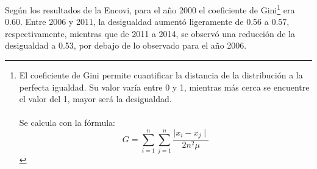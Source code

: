 Según los resultados de la Encovi, para el año 2000 el coeficiente de Gini\footnote{El coeficiente de Gini permite cuantificar la distancia de la distribución a la perfecta igualdad. Su valor varía entre 0 y 1, mientras más cerca se encuentre el valor del 1, mayor será la desigualdad. \\\\ 
	Se calcula con la fórmula: 
	\[ G= \sum_{i=1}^{n}\sum_{j=1}^{n}\frac{\mid x_i - x_j \mid}{2n^2\mu} \]} era 0.60. Entre 2006 y 2011, la desigualdad aumentó ligeramente de 0.56 a 0.57, respectivamente, mientras que de 2011 a 2014, se observó una reducción de la desigualdad a 0.53, por debajo de lo observado para el año 2006.
